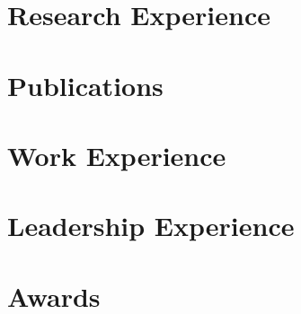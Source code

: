 \documentclass[11pt]{article} %
\begin{document}





\pagebreak[3]
\section{Research Experience}






\pagebreak[3]
\section{Publications}




\pagebreak[3]
\section{Work Experience}








\pagebreak[3]
\section{Leadership Experience}



\pagebreak[3]
\section{Awards}
\end{document}
